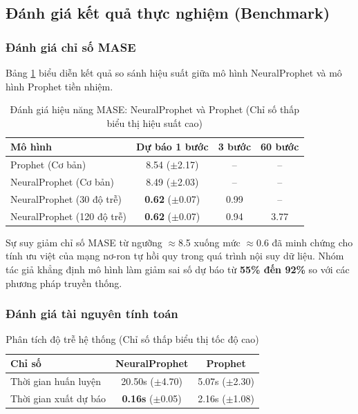\documentclass[12pt,a4paper]{article}
\begin{document}
\subsection{Đánh giá kết quả thực nghiệm (Benchmark)}

\subsubsection{Đánh giá chỉ số MASE}

Bảng \ref{tab:np_mase} biểu diễn kết quả so sánh hiệu suất giữa mô hình NeuralProphet và mô hình Prophet tiền nhiệm.

\begin{table}[htbp]
\centering
\caption{Đánh giá hiệu năng MASE: NeuralProphet và Prophet (Chỉ số thấp biểu thị hiệu suất cao)}
\label{tab:np_mase}
\begin{tabular}{|l|c|c|c|}
\hline
\textbf{Mô hình} & \textbf{Dự báo 1 bước} & \textbf{3 bước} & \textbf{60 bước} \\
\hline
Prophet (Cơ bản) & 8.54 ($\pm$2.17) & -- & -- \\
NeuralProphet (Cơ bản) & 8.49 ($\pm$2.03) & -- & -- \\
NeuralProphet (30 độ trễ) & \textbf{0.62} ($\pm$0.07) & 0.99 & -- \\
NeuralProphet (120 độ trễ) & \textbf{0.62} ($\pm$0.07) & 0.94 & 3.77 \\
\hline
\end{tabular}
\end{table}

Sự suy giảm chỉ số MASE từ ngưỡng $\approx$8.5 xuống mức $\approx$0.6 đã minh chứng cho tính ưu việt của mạng nơ-ron tự hồi quy trong quá trình nội suy dữ liệu. Nhóm tác giả khẳng định mô hình làm giảm sai số dự báo từ \textbf{55\% đến 92\%} so với các phương pháp truyền thống.

\subsubsection{Đánh giá tài nguyên tính toán}

\begin{table}[htbp]
\centering
\caption{Phân tích độ trễ hệ thống (Chỉ số thấp biểu thị tốc độ cao)}
\label{tab:np_compute}
\begin{tabular}{|l|c|c|}
\hline
\textbf{Chỉ số} & \textbf{NeuralProphet} & \textbf{Prophet} \\
\hline
Thời gian huấn luyện & 20.50s ($\pm$4.70) & 5.07s ($\pm$2.30) \\
Thời gian xuất dự báo & \textbf{0.16s} ($\pm$0.05) & 2.16s ($\pm$1.08) \\
\hline
\end{tabular}
\end{table}
\end{document}
